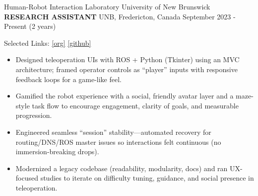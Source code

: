 

\begin{cventries}
    \cventry
    {Human-Robot Interaction Laboratory \textemdash University of New Brunswick}
    {\textbf{RESEARCH ASSISTANT}}
    {UNB, Fredericton, Canada}
    {September 2023 - Present (2 years)}
    {
        Selected Links: \hspace{0.1 cm} \href{https://hcilab.github.io/} {\textcolor{cobalt}{[org]}} \hspace{0.1 cm} 
        \href{https://github.com/ph504/Teleoperation-Interface} {\textcolor{cobalt}{[github]}} \hspace{0.1 cm}
        \vspace{0.2 cm}
        \begin{itemize}
            \item Designed teleoperation UIs with ROS + Python (Tkinter) using an MVC architecture; framed operator controls as “player” inputs with responsive feedback loops for a game-like feel.
            \item Gamified the robot experience with a social, friendly avatar layer and a maze-style task flow to encourage engagement, clarity of goals, and measurable progression.
            \item Engineered seamless “session” stability—automated recovery for routing/DNS/ROS master issues so interactions felt continuous (no immersion-breaking drops).
            \item Modernized a legacy codebase (readability, modularity, docs) and ran UX-focused studies to iterate on difficulty tuning, guidance, and social presence in teleoperation.

\end{itemize}}
\end{cventries}
